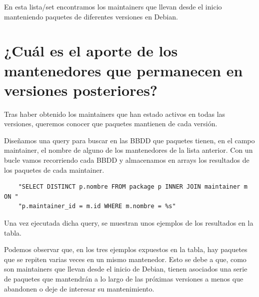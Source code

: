 \documentclass[a4paper, 12pt]{book}
\begin{document}
En esta lista/set encontramos los maintainers que llevan desde el inicio manteniendo paquetes de diferentes versiones en Debian.

\section{¿Cuál es el aporte de los mantenedores que permanecen en versiones posteriores?}
\label{sec:pregunta_4}
Tras haber obtenido los maintainers que han estado activos en todas las versiones, queremos conocer que paquetes mantienen de cada versión.

Diseñamos una query para buscar en las BBDD que paquetes tienen, en el campo maintainer, el nombre de alguno de los mantenedores de la lista anterior. Con un bucle vamos recorriendo cada BBDD y almacenamos en arrays los resultados de los paquetes de cada maintainer.

\begin{verbatim}
	"SELECT DISTINCT p.nombre FROM package p INNER JOIN maintainer m ON "
	"p.maintainer_id = m.id WHERE m.nombre = %s"
\end{verbatim}
Una vez ejecutada dicha query, se muestran unos ejemplos de los resultados en la tabla.

Podemos observar que, en los tres ejemplos expuestos en la tabla, hay paquetes que se repiten varias veces en un mismo mantenedor. Esto se debe a que, como son maintainers que llevan desde el inicio de Debian, tienen asociados una serie de paquetes que mantendrán a lo largo de las próximas versiones a menos que abandonen o deje de interesar su mantenimiento.
\end{document}
